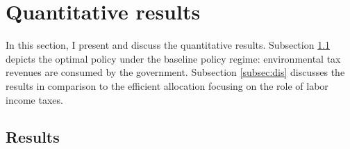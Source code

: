 \section{Quantitative results}\label{sec:res}

In this section, I present and discuss the quantitative results.
Subsection \ref{subsec:mr} depicts the optimal policy under the baseline policy regime: environmental tax revenues are consumed by the government. Subsection \ref{subsec:dis} discusses the results in comparison to the efficient allocation focusing on the role of labor income taxes.


\subsection{Results}\label{subsec:mr}

